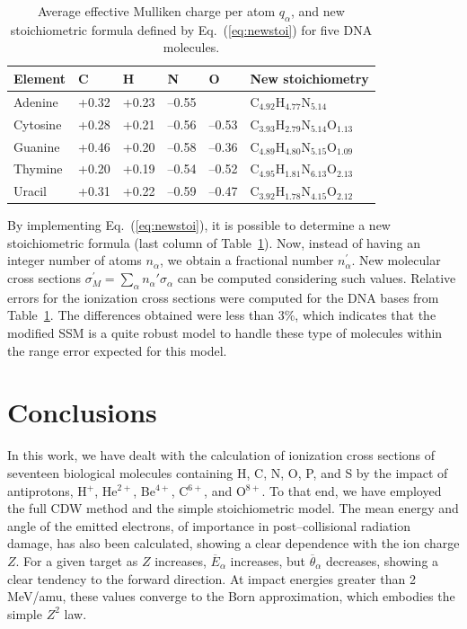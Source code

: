 \documentclass[10pt,showpacs,twocolumn]{revtex4}
\begin{document}
\begin{table}[t]
\begin{center}
\begin{tabular}{|p{}|p{}|p{}|p{
}|p{}|p{}|}
\hline
Element & C & H & N & O & New stoichiometry \\
\hline
Adenine & +0.32 & +0.23 & --0.55 &       & 
C$_{4.92}$H$_{4.77}$N$_{5.14}$ \\ 
\hline
Cytosine & +0.28 & +0.21 & --0.56 & --0.53 & 
C$_{3.93}$H$_{2.79}$N$_{5.14}$O$_{1.13}$ \\ 
\hline
Guanine & +0.46 & +0.20 & --0.58 & --0.36 & 
C$_{4.89}$H$_{4.80}$N$_{5.15}$O$_{1.09}$ \\ 
\hline
Thymine & +0.20 & +0.19 & --0.54 & --0.52 & 
C$_{4.95}$H$_{1.81}$N$_{6.13}$O$_{2.13}$ \\ 
\hline
Uracil & +0.31 & +0.22 & --0.59 & --0.47 & 
C$_{3.92}$H$_{1.78}$N$_{4.15}$O$_{2.12}$ \\ 
\hline
\end{tabular}
\caption{Average effective Mulliken charge per atom $q_{\alpha}$, and 
new stoichiometric formula defined by Eq.~(\ref{eq:newstoi}) for five 
DNA molecules.}
\label{tab:newstoi}
\end{center}
\end{table}

By implementing Eq.~(\ref{eq:newstoi}), it is possible to determine a 
new stoichiometric formula (last column of Table~\ref{tab:newstoi}). 
Now, instead of having an integer number of atoms $n_{\alpha}$, we obtain 
a fractional number $n_{\alpha}^{\prime}$. New molecular cross sections 
$\sigma^{\prime}_{M}=\sum_{\alpha}n_{\alpha}'\sigma_{\alpha}$ can be 
computed considering 
such values. Relative errors for the ionization cross sections were 
computed for the DNA bases from Table~\ref{tab:newstoi}. The differences 
obtained were less than 3\%, which indicates that the modified 
SSM is a quite robust model to handle these type of molecules within 
the range error expected for this model.

\section{Conclusions}

In this work, we have dealt with the calculation of ionization cross 
sections of seventeen biological molecules containing H, C, N, O, P, and 
S by the impact of antiprotons, H$^{+}$, He$^{2+}$, Be$^{4+}$, C$^{6+}$, 
and O$^{8+}$. To that end, we have employed the full CDW method and the 
simple stoichiometric model. 
The mean energy and angle of the emitted electrons, of importance in 
post--collisional radiation damage,  has also been calculated, showing 
a clear dependence with the ion charge $Z$. For a given target as $Z$ 
increases, $\overline{E}_{\alpha}$
increases, but $\overline{\theta}_{\alpha}$ decreases, showing a clear 
tendency to the forward direction. At impact
energies greater than 2 MeV/amu, these values converge to the Born
approximation, which embodies the simple $Z^{2}$ law. 
\end{document}
